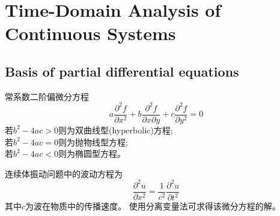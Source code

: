 \chapter{Time-Domain Analysis of Continuous Systems}

\section{Basis of partial differential equations}\label{sec::basis}

常系数二阶偏微分方程
\begin{equation}
    a\frac{\partial^{2}f}{\partial x^{2}}+b\frac{\partial^{2}f}{\partial x\partial y}+c\frac{\partial^{2}f}{\partial y^{2}}=0
\end{equation}
若$b^{2}-4ac>0$则为双曲线型(hyperbolic)方程;\\
若$b^{2}-4ac=0$则为抛物线型方程;\\
若$b^{2}-4ac<0$则为椭圆型方程。

连续体振动问题中的波动方程为
\begin{equation}\label{eq-1::wave}
    \frac{\partial^{2}u}{\partial x^{2}}=\frac{1}{c^{2}}\frac{\partial^{2}u}{\partial t^{2}}
\end{equation}
其中$c$为波在物质中的传播速度。
使用分离变量法可求得该微分方程的解。


